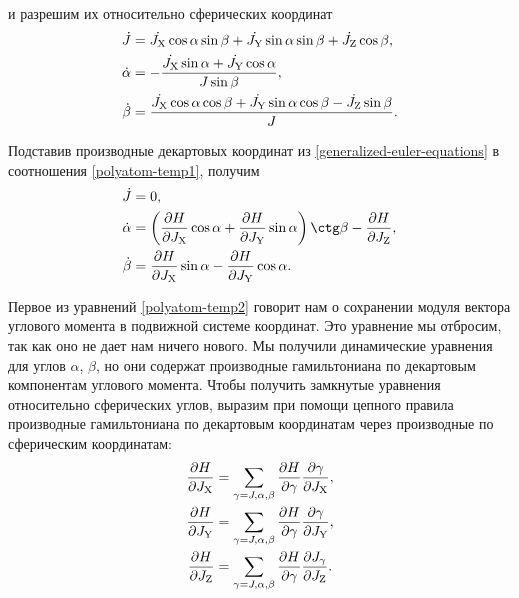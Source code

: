 и разрешим их относительно сферических координат
\begin{gather}
    \begin{aligned}
        \dot{J} &= \dot{J_\text{X}} \cos \alpha \sin \beta + \dot{J_\text{Y}} \sin \alpha \sin \beta + \dot{J_\text{Z}} \cos \beta, \\
        \dot{\alpha} &= -\frac{\dot{J_\text{X}} \sin \alpha + \dot{J_\text{Y}} \cos \alpha}{J \sin \beta}, \\
        \dot{\beta} &= \frac{\dot{J_\text{X}} \cos \alpha \cos \beta + \dot{J_\text{Y}} \sin \alpha \cos \beta  - \dot{J_\text{Z}} \sin \beta}{J}.
    \end{aligned} \label{polyatom-temp1}
\end{gather}

Подставив производные декартовых координат из \eqref{generalized-euler-equations} в соотношения \eqref{polyatom-temp1}, получим
\begin{gather}
    \begin{aligned}
        \dot{J} &= 0, \\
        \dot{\alpha} &= \lb \frac{\partial H}{\partial \Jx} \cos \alpha + \frac{\partial H}{\partial \Jy} \sin \alpha \rb \ctg \beta - \frac{\partial H}{\partial \Jz}, \\
        \dot{\beta} &= \frac{\partial H}{\partial \Jx} \sin \alpha - \frac{\partial H}{\partial \Jy} \cos \alpha.
    \end{aligned} \label{polyatom-temp2}
\end{gather}

Первое из уравнений \eqref{polyatom-temp2} говорит нам о сохранении модуля вектора углового момента в подвижной системе координат. Это уравнение мы отбросим, так как оно не дает нам ничего нового. Мы получили динамические уравнения для углов $\alpha$, $\beta$, но они содержат производные гамильтониана по декартовым компонентам углового момента. Чтобы получить замкнутые уравнения относительно сферических углов, выразим при помощи цепного правила производные гамильтониана по декартовым координатам через производные по сферическим координатам:    
\begin{gather}
    \begin{aligned}
        \frac{\partial H}{\partial J_\text{X}} &= \sum_{\gamma = J, \alpha, \beta} \frac{\partial H}{\partial \gamma} \frac{\partial \gamma}{\partial J_\text{X}}, \\
        \frac{\partial H}{\partial J_\text{Y}} &= \sum_{\gamma = J, \alpha, \beta} \frac{\partial H}{\partial \gamma} \frac{\partial \gamma}{\partial J_\text{Y}}, \\
        \frac{\partial H}{\partial J_\text{Z}} &= \sum_{\gamma = J, \alpha, \beta} \frac{\partial H}{\partial \gamma} \frac{\partial J_\gamma}{\partial J_\text{Z}}.
    \end{aligned} \label{polyatom-temp3}
\end{gather}

